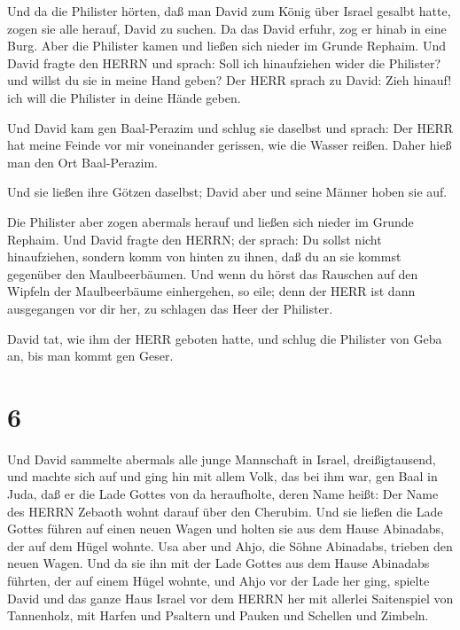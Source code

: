  Und da die Philister hörten, daß man David zum König über
Israel gesalbt hatte, zogen sie alle herauf, David zu suchen. Da das
David erfuhr, zog er hinab in eine Burg.  Aber die
Philister kamen und ließen sich nieder im Grunde Rephaim. 
Und David fragte den HERRN und sprach: Soll ich hinaufziehen wider die
Philister? und willst du sie in meine Hand geben? Der HERR sprach zu
David: Zieh hinauf! ich will die Philister in deine Hände geben.

 Und David kam gen Baal-Perazim und schlug sie daselbst und
sprach: Der HERR hat meine Feinde vor mir voneinander gerissen, wie die
Wasser reißen. Daher hieß man den Ort Baal-Perazim.

 Und sie ließen ihre Götzen daselbst; David aber und seine
Männer hoben sie auf.

 Die Philister aber zogen abermals herauf und ließen sich
nieder im Grunde Rephaim.  Und David fragte den HERRN; der
sprach: Du sollst nicht hinaufziehen, sondern komm von hinten zu ihnen,
daß du an sie kommst gegenüber den Maulbeerbäumen.  Und
wenn du hörst das Rauschen auf den Wipfeln der Maulbeerbäume
einhergehen, so eile; denn der HERR ist dann ausgegangen vor dir her, zu
schlagen das Heer der Philister.

 David tat, wie ihm der HERR geboten hatte, und schlug die
Philister von Geba an, bis man kommt gen Geser.

\hypertarget{section-5}{%
\section{6}\label{section-5}}

 Und David sammelte abermals alle junge Mannschaft in
Israel, dreißigtausend,  und machte sich auf und ging hin
mit allem Volk, das bei ihm war, gen Baal in Juda, daß er die Lade
Gottes von da heraufholte, deren Name heißt: Der Name des HERRN Zebaoth
wohnt darauf über den Cherubim.  Und sie ließen die Lade
Gottes führen auf einen neuen Wagen und holten sie aus dem Hause
Abinadabs, der auf dem Hügel wohnte. Usa aber und Ahjo, die Söhne
Abinadabs, trieben den neuen Wagen.  Und da sie ihn mit der
Lade Gottes aus dem Hause Abinadabs führten, der auf einem Hügel wohnte,
und Ahjo vor der Lade her ging,  spielte David und das ganze
Haus Israel vor dem HERRN her mit allerlei Saitenspiel von Tannenholz,
mit Harfen und Psaltern und Pauken und Schellen und Zimbeln.

